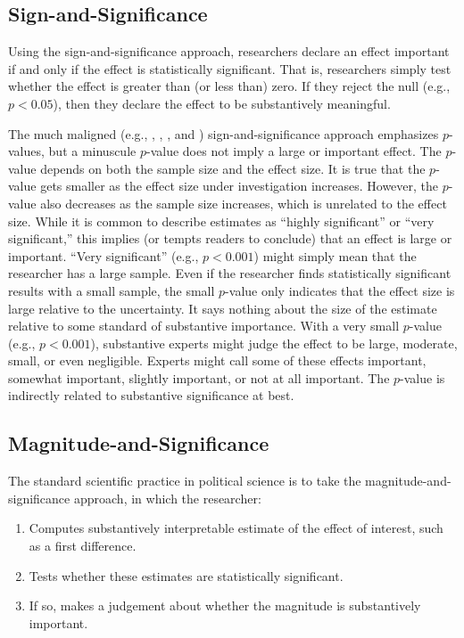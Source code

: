 \documentclass[12pt]{article}
\begin{document}
\subsection*{Sign-and-Significance}

Using the sign-and-significance approach, researchers declare an effect important if and only if the effect is statistically significant. That is, researchers simply test whether the effect is greater than (or less than) zero. If they reject the null (e.g., $p < 0.05$), then they declare the effect to be substantively meaningful.

The much maligned (e.g., \citealt{Cohen1990}, \citealt{Gill1999}, \citealt{HillJones2014}, and \citealt{Gross2014}) sign-and-significance approach emphasizes $p$-values, but a minuscule $p$-value does not imply a large or important effect. The $p$-value depends on both the sample size and the effect size. It is true that the $p$-value gets smaller as the effect size under investigation increases. However, the $p$-value also decreases as the sample size increases, which is unrelated to the effect size. While it is common to describe estimates as ``highly significant'' or ``very significant,'' this implies (or tempts readers to conclude) that an effect is large or important. ``Very significant'' (e.g., $p < 0.001$) might simply mean that the researcher has a large sample. Even if the researcher finds statistically significant results with a small sample, the small $p$-value only indicates that the effect size is large relative to the uncertainty. It says nothing about the size of the estimate relative to some standard of substantive importance. With a very small $p$-value (e.g., $p < 0.001$), substantive experts might judge the effect to be large, moderate, small, or even negligible. Experts might call some of these effects important, somewhat important, slightly important, or not at all important. The $p$-value is indirectly related to substantive significance at best.

\subsection*{Magnitude-and-Significance}

The standard scientific practice in political science is to take the magnitude-and-significance approach, in which the researcher: 

\begin{enumerate}
\item Computes substantively interpretable estimate of the effect of interest, such as a first difference.
\item Tests whether these estimates are statistically significant.
\item If so, makes a judgement about whether the magnitude is substantively important.
\end{enumerate}
\end{document}
